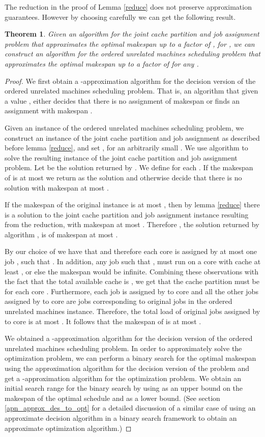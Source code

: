 \documentclass[11pt]{article}
\newtheorem{theorem}{Theorem}[section]
\begin{document}
The reduction in the proof of Lemma \ref{reduce}  does not preserve approximation guarantees.
However by choosing  carefully we can get the following result.
\begin{theorem}\label{reduce_approx}
  Given an algorithm  for the joint cache partition and job assignment problem that approximates the optimal makespan up to a factor of , for , we can construct an algorithm for
  the ordered unrelated machines scheduling problem that approximates the optimal makespan up to a factor of  for any .
\end{theorem}
\begin{proof}
We first obtain a -approximation algorithm for the decision version of the ordered unrelated machines scheduling problem.
That is, an algorithm that given a value , either decides that there is no assignment of makespan  or finds an assignment with makespan .

Given an instance of the ordered unrelated machines scheduling problem, we construct an instance of the joint cache partition and job assignment as described before lemma \ref{reduce},
and set  , for an arbitrarily small .
We use algorithm  to solve the resulting instance of the joint cache partition and job assignment problem. Let  be the solution returned by .
We define  for each .
If the makespan of  is at most  we return  as the solution and otherwise decide that there is no solution with makespan at most .

If the makespan of the original instance is at most , then  by lemma \ref{reduce} there is a solution to the joint cache partition and job assignment instance resulting from the reduction, with makespan at most .
Therefore  , the solution returned by algorithm , is of makespan at most .

By our choice of  we have that  and therefore each core is assigned by  at most one job , such that .
In addition, any job  such that , must run on a core with cache at least , or else the makespan would be infinite.
Combining these observations with the fact that the total available cache is , we get that the cache partition must be  for each core .
Furthermore, each job  is assigned by  to core  and all the other jobs assigned by  to core  are jobs
corresponding to original jobs in the ordered unrelated machines instance. Therefore, the total load of original jobs assigned by  to core  is at most .
It follows that the makespan of  is
 at most .

We obtained a -approximation algorithm for the decision version of the ordered unrelated machines scheduling problem.
In order to approximately solve the optimization problem, we can perform a binary search for the optimal makespan using the approximation algorithm for the decision version of the problem and get a
-approximation algorithm for the optimization problem. We obtain an initial search range for the binary search by using  as an upper bound on the makespan of the optimal schedule and  as a lower bound.
(See section \ref{apn_approx_des_to_opt} for a detailed discussion of a similar case of using an approximate decision algorithm in a binary search framework to obtain an approximate optimization algorithm.)
\end{proof}
\end{document}
